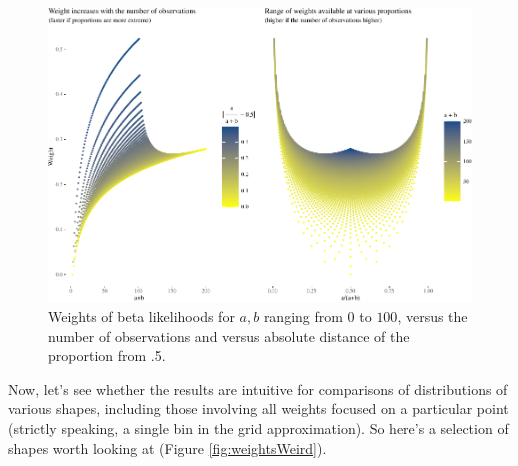 \documentclass[
  10pt,
  dvipsnames,enabledeprecatedfontcommands]{scrartcl}
\begin{document}
\begin{figure}[H]

\begin{center}\includegraphics[width=1\linewidth]{impreciseEpistemicFINAL_files/figure-latex/fig:weights-1} \end{center}
\caption{Weights of beta likelihoods for $a,b$ ranging from $0$ to $100$, versus the number of observations   and versus absolute distance of the proportion from .5.}
\label{fig:weights}
\end{figure}

Now, let's see whether the results are intuitive for comparisons of
distributions of various shapes, including those involving all weights
focused on a particular point (strictly speaking, a single bin in the
grid approximation). So here's a selection of shapes worth looking at
(Figure \ref{fig:weightsWeird}).
\end{document}
